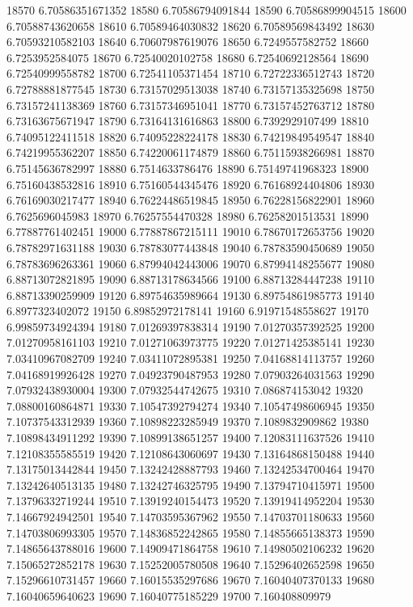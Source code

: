 {18570 6.70586351671352
18580 6.70586794091844
18590 6.70586899904515
18600 6.70588743620658
18610 6.70589464030832
18620 6.70589569843492
18630 6.70593210582103
18640 6.70607987619076
18650 6.7249557582752
18660 6.7253952584075
18670 6.72540020102758
18680 6.72540692128564
18690 6.72540999558782
18700 6.72541105371454
18710 6.72722336512743
18720 6.72788881877545
18730 6.73157029513038
18740 6.73157135325698
18750 6.73157241138369
18760 6.73157346951041
18770 6.73157452763712
18780 6.73163675671947
18790 6.73164131616863
18800 6.7392929107499
18810 6.74095122411518
18820 6.74095228224178
18830 6.74219849549547
18840 6.74219955362207
18850 6.74220061174879
18860 6.75115938266981
18870 6.75145636782997
18880 6.7514633786476
18890 6.75149741968323
18900 6.75160438532816
18910 6.75160544345476
18920 6.76168924404806
18930 6.76169030217477
18940 6.76224486519845
18950 6.76228156822901
18960 6.7625696045983
18970 6.76257554470328
18980 6.76258201513531
18990 6.77887761402451
19000 6.77887867215111
19010 6.78670172653756
19020 6.78782971631188
19030 6.78783077443848
19040 6.78783590450689
19050 6.78783696263361
19060 6.87994042443006
19070 6.87994148255677
19080 6.88713072821895
19090 6.88713178634566
19100 6.88713284447238
19110 6.88713390259909
19120 6.89754635989664
19130 6.89754861985773
19140 6.8977323402072
19150 6.89852972178141
19160 6.91971548558627
19170 6.99859734924394
19180 7.01269397838314
19190 7.01270357392525
19200 7.01270958161103
19210 7.01271063973775
19220 7.01271425385141
19230 7.03410967082709
19240 7.03411072895381
19250 7.04168814113757
19260 7.04168919926428
19270 7.04923790487953
19280 7.07903264031563
19290 7.07932438930004
19300 7.07932544742675
19310 7.086874153042
19320 7.08800160864871
19330 7.10547392794274
19340 7.10547498606945
19350 7.10737543312939
19360 7.10898223285949
19370 7.1089832909862
19380 7.10898434911292
19390 7.10899138651257
19400 7.12083111637526
19410 7.12108355585519
19420 7.12108643060697
19430 7.13164868150488
19440 7.13175013442844
19450 7.13242428887793
19460 7.13242534700464
19470 7.13242640513135
19480 7.13242746325795
19490 7.13794710415971
19500 7.13796332719244
19510 7.13919240154473
19520 7.13919414952204
19530 7.14667924942501
19540 7.14703595367962
19550 7.14703701180633
19560 7.14703806993305
19570 7.14836852242865
19580 7.14855665138373
19590 7.14865643788016
19600 7.14909471864758
19610 7.14980502106232
19620 7.15065272852178
19630 7.15252005780508
19640 7.15296402652598
19650 7.15296610731457
19660 7.16015535297686
19670 7.16040407370133
19680 7.16040659640623
19690 7.16040775185229
19700 7.160408809979
}
